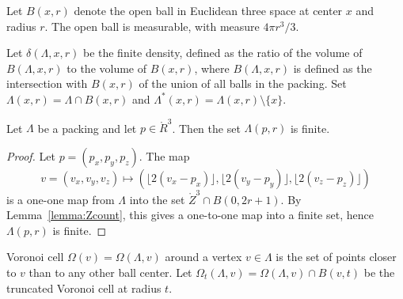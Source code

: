 



  Let $B(x,r)$ denote the open ball in
Euclidean three space at center $x$ and radius $r$.  The open ball
is measurable, with measure $4\pi r^3/3$.



Let $\delta(\Lambda,x,r)$ be the finite density, defined as the
ratio of the volume of $B(\Lambda,x,r)$ to the volume of $B(x,r)$,
where $B(\Lambda,x,r)$ is defined as the intersection with
$B(x,r)$ of the union of all balls in the packing. Set
$\Lambda(x,r) = \Lambda \cap
B(x,r)$ and $\Lambda^*(x,r) = \Lambda(x,r)\setminus \{x\}$.

\begin{lemma}\label{lemma:Lambda-finite}
Let $\Lambda$ be a packing and let $p\in\ring{R}^3$.
Then the set $\Lambda(p,r)$ is finite.
\end{lemma}

\begin{proof}  Let $p = (p_x,p_y,p_z)$. The map
$$v=(v_x,v_y,v_z)\mapsto (\lfloor 2(v_x-p_x)
\rfloor, \lfloor 2(v_y-p_y) \rfloor, \lfloor 2(v_z-p_z) \rfloor)$$
is a one-one map from $\Lambda$ into the set $\ring{Z}^3\cap B(0,2
r
 + 1)$.  By Lemma~\ref{lemma:Zcount}, this gives a one-to-one map
 into a finite set, hence $\Lambda(p,r)$ is finite.
\end{proof}


\begin{definition}\label{def:voronoi} Voronoi cell
$\Omega(v)=\Omega(\Lambda,v)$ around a
vertex $v\in \Lambda$ is the set of points closer to $v$ than to
any other ball center.  Let $\Omega_t(\Lambda,v) = \Omega(\Lambda,v)
\cap B(v,t)$ be the truncated Voronoi cell at radius $t$.
\end{definition}

